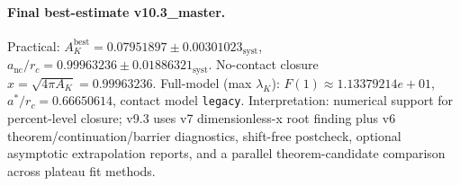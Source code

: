 \paragraph{Final best-estimate v10.3_master.}
Practical: $A_K^{\mathrm{best}} = 0.07951897 \pm 0.00301023_{\mathrm{syst}}$, $a_{\mathrm{nc}}/r_c = 0.99963236 \pm 0.01886321_{\mathrm{syst}}$.
No-contact closure $x = \sqrt{4\pi A_K} = 0.99963236$.
Full-model (max $\lambda_K$): $F(1) \approx 1.13379214e+01$, $a^*/r_c = 0.66650614$, contact model \texttt{legacy}.
Interpretation: numerical support for percent-level closure; v9.3 uses v7 dimensionless-x root finding plus v6 theorem/continuation/barrier diagnostics, shift-free postcheck, optional asymptotic extrapolation reports, and a parallel theorem-candidate comparison across plateau fit methods.
